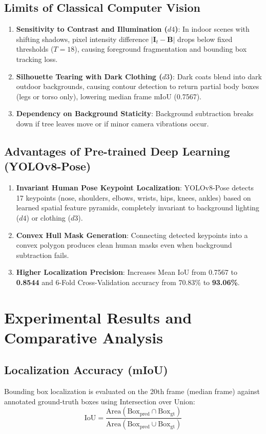 \documentclass[11pt,a4paper]{article}
\begin{document}
\subsection{Limits of Classical Computer Vision}
\begin{enumerate}
    \item \textbf{Sensitivity to Contrast and Illumination ($d4$)}: In indoor scenes with shifting shadows, pixel intensity difference $|\mathbf{I}_t - \mathbf{B}|$ drops below fixed thresholds ($T=18$), causing foreground fragmentation and bounding box tracking loss.
    \item \textbf{Silhouette Tearing with Dark Clothing ($d3$)}: Dark coats blend into dark outdoor backgrounds, causing contour detection to return partial body boxes (legs or torso only), lowering median frame mIoU (0.7567).
    \item \textbf{Dependency on Background Staticity}: Background subtraction breaks down if tree leaves move or if minor camera vibrations occur.
\end{enumerate}

\subsection{Advantages of Pre-trained Deep Learning (YOLOv8-Pose)}
\begin{enumerate}
    \item \textbf{Invariant Human Pose Keypoint Localization}: YOLOv8-Pose detects 17 keypoints (nose, shoulders, elbows, wrists, hips, knees, ankles) based on learned spatial feature pyramids, completely invariant to background lighting ($d4$) or clothing ($d3$).
    \item \textbf{Convex Hull Mask Generation}: Connecting detected keypoints into a convex polygon produces clean human masks even when background subtraction fails.
    \item \textbf{Higher Localization Precision}: Increases Mean IoU from 0.7567 to \textbf{0.8544} and 6-Fold Cross-Validation accuracy from 70.83\% to \textbf{93.06\%}.
\end{enumerate}

\section{Experimental Results and Comparative Analysis}

\subsection{Localization Accuracy (mIoU)}
Bounding box localization is evaluated on the 20th frame (median frame) against annotated ground-truth boxes using Intersection over Union:
\begin{equation}
    \text{IoU} = \frac{\text{Area}(\text{Box}_{\text{pred}} \cap \text{Box}_{\text{gt}})}{\text{Area}(\text{Box}_{\text{pred}} \cup \text{Box}_{\text{gt}})}
\end{equation}
\end{document}
